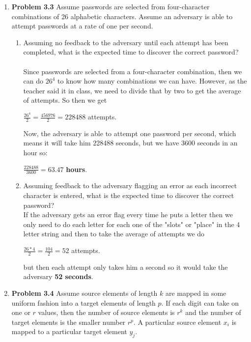 \documentclass[12pt]{article}
\begin{document}
\begin{enumerate}
	\item {\textbf{Problem 3.3}  Assume passwords are selected from four-character combinations of 26 alphabetic characters. Assume an adversary is able to attempt passwords at a rate of one per second.}
	 
	\begin{enumerate}
		\item Assuming no feedback to the adversary until each attempt has been completed, what is the expected time to discover the correct password? \\\\
		Since passwords are selected from a four-character combination, then we can do $26^4$ to know how many combinations we can have. However, as the teacher said it in class, we need to divide that by two to get the average of attempts. So then we get \begin{center} $\frac{26^4}{2} = \frac{456976}{2} = 228488$ attempts.\end{center}
		 Now, the adversary is able to attempt one password per second, which means it will take him 228488 seconds, but we have 3600 seconds in an hour so:
		\begin{center} $\frac{228488}{3600} =  \mathbf{63.47} $ \textbf{hours}. \end{center}
		
		\item Assuming feedback to the adversary flagging an error as each incorrect character is entered, what is the expected time to discover the correct password? \\
		If the adversary gets an error flag every time he puts a letter then we only need to do each letter for each one of the "slots" or "place" in the 4 letter string and then to take the average of attempts we do \begin{center} $\frac{26*4}{2} = \frac{104}{2} = 52$ attempts.\end{center} but then each attempt only takes him a second so it would take the adversary \textbf{52 seconds}.
	\end{enumerate}

	\vspace{10pt}
	
	\item {\textbf{Problem 3.4} Assume source elements of length $k$ are mapped in some uniform fashion into a target elements of length $p$. If each digit can take on one or $r$ values, then the number of source elements is $r^k$ and the number of target elements is the smaller number $r^p$. A particular source element $x_i$ is mapped to a particular target element $y_j$.}
	 

\end{enumerate}
\end{document}

